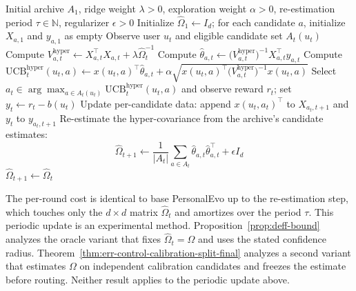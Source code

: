 \documentclass{article} %
\begin{document}
\begin{algorithm}[t]
\caption{Hyper-Ridge PersonalEvo routing}
\label{alg:hyper-ridge}
\begin{algorithmic}[1]
\Require Initial archive $A_1$, ridge weight $\lambda > 0$, exploration
  weight $\alpha > 0$, re-estimation period $\tau \in \mathbb{N}$,
  regularizer $\epsilon > 0$
\State Initialize $\widehat{\Omega}_1 \gets I_d$; for each candidate $a$,
  initialize $X_{a,1}$ and $y_{a,1}$ as empty
  \State Observe user $u_t$ and eligible candidate set $A_t(u_t)$
    \State Compute
      $V_{a,t}^{\mathrm{hyper}} \gets X_{a,t}^\top X_{a,t}
        + \lambda \widehat{\Omega}_t^{-1}$
    \State Compute
      $\widehat{\theta}_{a,t} \gets
        \bigl( V_{a,t}^{\mathrm{hyper}} \bigr)^{-1}
        X_{a,t}^\top y_{a,t}$
    \State Compute
      $\mathrm{UCB}_t^{\mathrm{hyper}}(u_t, a) \gets
        x(u_t, a)^\top \widehat{\theta}_{a,t}
        + \alpha \sqrt{ x(u_t, a)^\top
          \bigl( V_{a,t}^{\mathrm{hyper}} \bigr)^{-1} x(u_t, a) }$
  \EndFor
  \State Select
    $a_t \in \arg\max_{a \in A_t(u_t)} \mathrm{UCB}_t^{\mathrm{hyper}}(u_t, a)$
    and observe reward $r_t$; set $y_t\gets r_t-b(u_t)$
  \State Update per-candidate data: append $x(u_t, a_t)^\top$ to
    $X_{a_t, t+1}$ and $y_t$ to $y_{a_t, t+1}$
    \State Re-estimate the hyper-covariance from the archive's
      candidate estimates:
      \begin{equation}
        \widehat{\Omega}_{t+1} \gets
          \frac{1}{|A_t|} \sum_{a \in A_t}
          \widehat{\theta}_{a,t} \widehat{\theta}_{a,t}^\top
          + \epsilon I_d
      \end{equation}
  \Else
    \State $\widehat{\Omega}_{t+1} \gets \widehat{\Omega}_t$
  \EndIf
\EndFor
\end{algorithmic}
\end{algorithm}

The per-round cost is identical to base PersonalEvo up to the
re-estimation step, which touches only the $d \times d$ matrix
$\widehat{\Omega}_t$ and amortizes over the period $\tau$. This periodic update
is an experimental method. Proposition~\ref{prop:deff-bound} analyzes the
oracle variant that fixes $\widehat\Omega_t=\Omega$ and uses the stated
confidence radius. Theorem~\ref{thm:err-control-calibration-split-final}
analyzes a second variant that estimates $\Omega$ on independent calibration
candidates and freezes the estimate before routing. Neither result applies to
the periodic update above.
\end{document}
